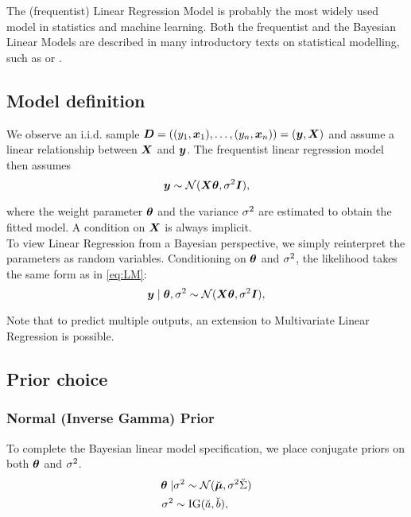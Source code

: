 The (frequentist) Linear Regression Model is probably the most widely used model in statistics and machine learning.
Both the frequentist and the Bayesian Linear Models are described in many introductory texts on statistical modelling, such as \citet{fahrmeir_regression_2021} or \citet{gelman_bayesian_2013}.


\subsection{Model definition}

We observe an i.i.d. sample $\bm{D} = ((y_1, \bm{x}_1), \dots, (y_n, \bm{x}_n))= (\bm{y}, \bm{X})$ and assume a linear relationship between $\bm{X}$ and $\bm{y}$.
The frequentist linear regression model then assumes
\begin{equation} \label{eq:LM}
    \bm{y} \sim \mathcal{N}(\bm{X} \bm{\theta}, \sigma^2 \bm{I}),
\end{equation}

where the weight parameter $\bm{\theta}$ and the variance $\sigma^2$ are estimated to obtain the fitted model.
A condition on $\bm{X}$ is always implicit.\\

To view Linear Regression from a Bayesian perspective, we simply reinterpret the parameters as random variables.
Conditioning on $\bm{\theta}$ and $\sigma^2$, the likelihood takes the same form as in \autoref{eq:LM}:
\begin{equation} \label{eq:BLM}
    \bm{y} \mid \bm{\theta}, \sigma^2 \sim \mathcal{N}(\bm{X} \bm{\theta}, \sigma^2 \bm{I}), 
\end{equation}

Note that to predict multiple outputs, an extension to Multivariate Linear Regression is possible.

\subsection{Prior choice}
\subsubsection*{Normal (Inverse Gamma) Prior}

To complete the Bayesian linear model specification, we place conjugate priors on both $\bm{\theta}$ and $\sigma^2$.
\begin{equation} \label{eq:NIGprior}
    \begin{aligned}
        \bm{\theta} \mid &\sigma^2 \sim  \mathcal{N}(\breve{\bm{\mu}}, \sigma^2 \breve{\Sigma}) \\
        \sigma^2 &\sim \text{IG}(\breve{a}, \breve{b}),
    \end{aligned}
\end{equation}

